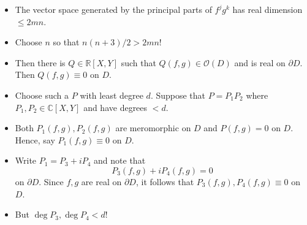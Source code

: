 \documentclass{beamer}
\begin{document}

\begin{frame}

\begin{itemize}
 \item The vector space generated by the principal parts of $f^j g^k$ has real dimension $\le 2mn$.

\medskip

 \item Choose $n$ so that $n(n + 3)/2 > 2mn$!

\medskip

 \item Then there is $Q \in \mathbb R[X, Y]$ such that $Q(f, g) \in \mathcal O (D)$ and is real on $\partial D$. Then $Q(f, g) \equiv 0$ on $D$.

\medskip

 \item Choose such a $P$ with least degree $d$. Suppose that $P = P_1 P_2$ where $P_1, P_2 \in \mathbb C[X, Y]$ and have degrees $< d$.

\end{itemize}

\end{frame}

\begin{frame}

 \begin{itemize}

 \item Both $P_1(f, g), P_2(f, g)$ are meromorphic on $D$ and $P(f, g) = 0$ on $D$. Hence, say $P_1(f, g) \equiv 0$ on $D$.

\medskip

 \item Write $P_1 = P_3 + i P_4$ and note that 
\[
P_3(f, g) + i P_4(f, g) = 0
\]
on $\partial D$. Since $f, g$ are real on $\partial D$, it follows that $P_3(f, g), P_4(f, g) \equiv 0$ on $D$. 

\medskip

 \item But $\deg P_3, \deg P_4 < d$!

\end{itemize}

\end{frame}

\end{document}

